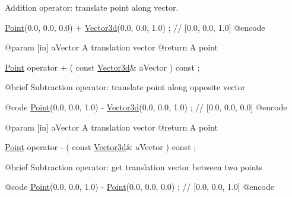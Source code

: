 Addition operator\+: translate point along vector. 


\begin{DoxyCode}
                        \hyperlink{classlibrary_1_1math_1_1geom_1_1d3_1_1objects_1_1_point_a617e690ab6091af3de729cee337e309e}{Point}(0.0, 0.0, 0.0) + \hyperlink{namespacelibrary_1_1math_1_1obj_a977e84e9bf317a4e7dd9d6d671d6da2f}{Vector3d}(0.0, 0.0, 1.0) ; \textcolor{comment}{// [0.0, 0.0, 1.0]}
    @encode
   
    @param              [in] aVector A translation vector
    @\textcolor{keywordflow}{return}             A point

\hyperlink{classlibrary_1_1math_1_1geom_1_1d3_1_1objects_1_1_point_a617e690ab6091af3de729cee337e309e}{Point}                   operator +                                  (   \textcolor{keyword}{const}   
      \hyperlink{namespacelibrary_1_1math_1_1obj_a977e84e9bf317a4e7dd9d6d671d6da2f}{Vector3d}&                   aVector                                     ) \textcolor{keyword}{const} ;

    @brief              Subtraction \textcolor{keyword}{operator}: translate point along opposite vector
   
    @code
                        \hyperlink{classlibrary_1_1math_1_1geom_1_1d3_1_1objects_1_1_point_a617e690ab6091af3de729cee337e309e}{Point}(0.0, 0.0, 1.0) - \hyperlink{namespacelibrary_1_1math_1_1obj_a977e84e9bf317a4e7dd9d6d671d6da2f}{Vector3d}(0.0, 0.0, 1.0) ; \textcolor{comment}{// [0.0, 0.0, 0.0]}
    @encode
   
    @param              [in] aVector A translation vector
    @\textcolor{keywordflow}{return}             A point

\hyperlink{classlibrary_1_1math_1_1geom_1_1d3_1_1objects_1_1_point_a617e690ab6091af3de729cee337e309e}{Point}                   operator -                                  (   \textcolor{keyword}{const}   
      \hyperlink{namespacelibrary_1_1math_1_1obj_a977e84e9bf317a4e7dd9d6d671d6da2f}{Vector3d}&                   aVector                                     ) \textcolor{keyword}{const} ;

    @brief              Subtraction \textcolor{keyword}{operator}: \textcolor{keyword}{get} translation vector between two points
   
    @code
                        \hyperlink{classlibrary_1_1math_1_1geom_1_1d3_1_1objects_1_1_point_a617e690ab6091af3de729cee337e309e}{Point}(0.0, 0.0, 1.0) - \hyperlink{classlibrary_1_1math_1_1geom_1_1d3_1_1objects_1_1_point_a617e690ab6091af3de729cee337e309e}{Point}(0.0, 0.0, 0.0)  ; \textcolor{comment}{// [0.0, 0.0, 1.0]}
    @encode
   

\end{DoxyCode}

